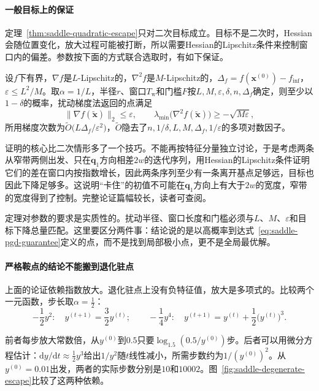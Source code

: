 \paragraph{一般目标上的保证}
定理~\ref{thm:saddle-quadratic-escape}只对二次目标成立。目标不是二次时，Hessian会随位置变化，放大过程可能被打断，所以需要Hessian的Lipschitz条件来控制窗口内的偏差。参数按下面的方式联合选取时，有如下保证。

\begin{theorem}[扰动梯度法的高概率保证]
 \label{thm:saddle-pgd}
 设$f$下有界，$\nabla f$是$L$-Lipschitz的，$\nabla^2f$是$M$-Lipschitz的，$\Delta_f=f(\bm{x}^{(0)})-f_{\inf}$，$\varepsilon\leq L^2/M$。取$\alpha=1/L$，半径$r$、窗口$T_{\mathrm{w}}$和门槛$F$按$L,M,\varepsilon,\delta,n,\Delta_f$确定，则至少以$1-\delta$的概率，扰动梯度法返回的点满足
 \begin{equation}
  \lVert\nabla f(\tilde{\bm{x}})\rVert_2\leq\varepsilon,\qquad
  \lambda_{\min}\bigl(\nabla^2f(\tilde{\bm{x}})\bigr)\geq-\sqrt{M\varepsilon},
  \label{eq:saddle-pgd-guarantee}
 \end{equation}
 所用梯度次数为$\tilde O\bigl(L\Delta_f/\varepsilon^2\bigr)$，$\tilde O$隐去了$n,1/\delta,L,M,\Delta_f,1/\varepsilon$的多项对数因子。
\end{theorem}

证明的核心比二次情形多了一个技巧。不能再按特征分量独立讨论，于是考虑两条从窄带两侧出发、只在$\bm{q}_1$方向相差$2w$的迭代序列，用Hessian的Lipschitz条件证明它们的差在窗口内按指数增长，因此两条序列至少有一条离开基点足够远，目标也因此下降足够多。这说明“卡住”的初值不可能在$\bm{q}_1$方向上有大于$2w$的宽度，窄带的宽度得到了控制。完整论证篇幅较长，读者可查阅。

定理对参数的要求是实质性的。扰动半径、窗口长度和门槛必须与$L$、$M$、$\varepsilon$和目标下降总量匹配。这里要区分两件事：结论说的是以高概率到达式~\eqref{eq:saddle-pgd-guarantee}定义的点，而不是找到局部极小点，更不是全局最优解。

\paragraph{严格鞍点的结论不能搬到退化驻点}
上面的论证依赖指数放大。退化驻点上没有负特征值，放大是多项式的。比较两个一元函数，步长取$\alpha=\tfrac12$：
\[
 -\frac12y^2:\quad y^{(t+1)}=\frac32y^{(t)};\qquad
 -\frac14y^4:\quad y^{(t+1)}=y^{(t)}+\frac12\bigl(y^{(t)}\bigr)^3.
\]

前者每步放大常数倍，从$y^{(0)}$到$0.5$只要$\log_{1.5}(0.5/y^{(0)})$步。后者可以用微分方程估计：$\mathrm{d}y/\mathrm{d}t\approx\tfrac12y^3$给出$1/y^2$随$t$线性减小，所需步数约为$1/(y^{(0)})^2$。从$y^{(0)}=0.01$出发，两者的实际步数分别是$10$和$10002$。图~\ref{fig:saddle-degenerate-escape}比较了这两种依赖。

